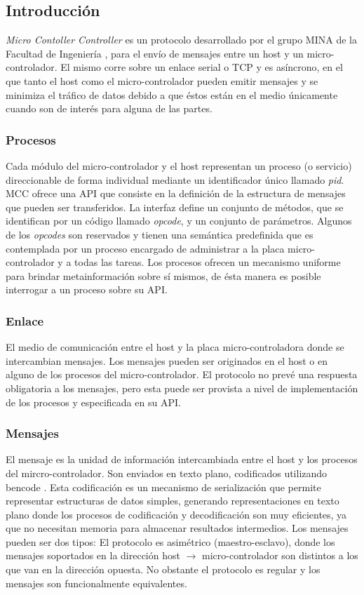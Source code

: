 \documentclass[withindex,glossary]{cam-thesis}
\begin{document}
\subsection{Introducción}
\textit{Micro Contoller Controller} es un protocolo desarrollado por el grupo MINA de la Facultad de Ingeniería \cite{GRUPOMINA}, para el envío de mensajes entre un host y un micro-controlador. El mismo corre sobre un enlace serial o TCP y es asíncrono, en el que tanto el host como el micro-controlador pueden emitir mensajes y se minimiza el tráfico de datos debido a que éstos están en el medio únicamente cuando son de interés para alguna de las partes. 

\subsubsection{Procesos}
Cada módulo del micro-controlador y el host representan un proceso (o servicio) direccionable de forma individual mediante un identificador único llamado \textit{pid}.
MCC ofrece una API que consiste en la definición de la estructura de mensajes que pueden ser transferidos. La interfaz define un conjunto de métodos, que se identifican por un código llamado \textit{opcode}, y un conjunto de parámetros. 
Algunos de los \textit{opcodes} son reservados y tienen una semántica predefinida que es contemplada por un proceso encargado de administrar a la placa micro-controlador y a todas las tareas. 
Los procesos ofrecen un mecanismo uniforme para brindar metainformación sobre sí mismos, de ésta manera es posible interrogar a un proceso sobre su API.

\subsubsection{Enlace}
El medio de comunicación entre el host y la placa micro-controladora donde se intercambian mensajes.
Los mensajes pueden ser originados en el host o en alguno de los procesos del micro-controlador. El protocolo no prevé una respuesta obligatoria a los mensajes, pero esta puede ser provista a nivel de implementación de los procesos y especificada en su API.

\subsubsection{Mensajes}
El mensaje es la unidad de información intercambiada entre el host y los procesos del mircro-controlador. Son enviados en texto plano, codificados utilizando bencode \cite{BENCODE}. Esta codificación es un mecanismo de serialización que permite representar estructuras de datos simples, generando representaciones en texto plano donde los procesos de codificación y decodificación son muy eficientes, ya que no necesitan memoria para almacenar resultados intermedios.
Los mensajes pueden ser dos tipos:
El protocolo es asimétrico (maestro-esclavo), donde los mensajes soportados en la dirección host $\rightarrow$ micro-controlador son distintos a los que van en la dirección opuesta. No obstante el protocolo es regular y los mensajes son funcionalmente equivalentes.
\end{document}
